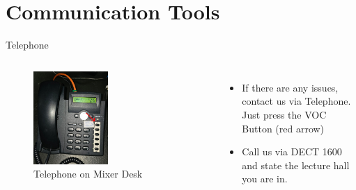 \documentclass[aspectratio=169]{beamer}
\begin{document}
\section{Communication Tools}
\begin{frame}{Telephone}
	\begin{columns}[T,onlytextwidth]
		\begin{figure} 
			\centering
			\includegraphics[width=0.5\textwidth]{images/telephone.png}
			\caption{Telephone on Mixer Desk}
		\end{figure}
		\begin{itemize}
		\item If there are any issues, contact us via Telephone. Just press the VOC Button (red arrow)
		\item Call us via DECT 1600 and state the lecture hall you are in.
		\end{itemize}
		
	\end{columns}
\end{frame}

\end{document}
